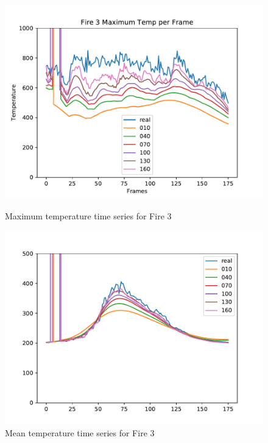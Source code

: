 \documentclass{article}
\begin{document}
\begin{figure}[ht] 
\centering
  \label{ fig7} 
  \begin{minipage}[b]{0.5\linewidth}
    \centering
    \includegraphics[width=1.05\linewidth]{../plots/f3_maxtemp.pdf} 
    \caption{Maximum temperature time series for Fire 3} 
    \vspace{4ex}
  \end{minipage}%
  \begin{minipage}[b]{0.5\linewidth}
    \centering
    \includegraphics[width=1.05\linewidth]{../plots/f3_meantemp.pdf} 
    \caption{Mean temperature time series for Fire 3} 
    \vspace{4ex}
  \end{minipage} 

\end{figure}
\end{document}
